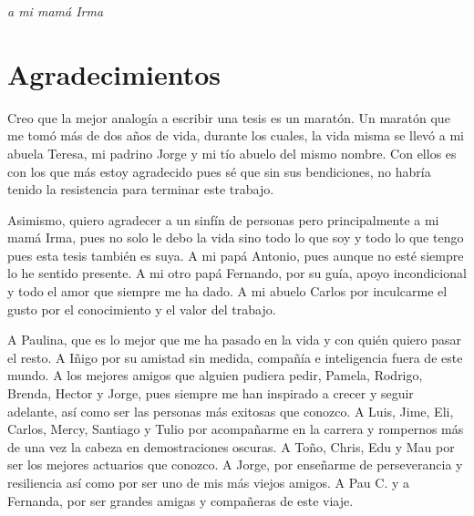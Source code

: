 \documentclass[../Main/Main.tex]{subfiles}
\begin{document}
\begin{flushright}
	\null{}
	\emph{a mi mamá Irma} 
	\null
\end{flushright}


\section*{Agradecimientos}
\thispagestyle{empty}

Creo que la mejor analogía a escribir una tesis es un maratón. Un maratón que me tomó más de dos años de vida, durante los cuales, la vida misma se llevó a mi abuela Teresa, mi padrino Jorge y mi tío abuelo del mismo nombre. Con ellos es con los que más estoy agradecido pues sé que sin sus bendiciones, no habría tenido la resistencia para terminar este trabajo.

Asimismo, quiero agradecer a un sinfín de personas pero principalmente a mi mamá Irma, pues no solo le debo la vida sino todo lo que soy y todo lo que tengo pues esta tesis también es suya. A mi papá Antonio, pues aunque no esté siempre lo he sentido presente. A mi otro papá Fernando, por su guía, apoyo incondicional y todo el amor que siempre me ha dado. A mi abuelo Carlos por inculcarme el gusto por el conocimiento y el valor del trabajo. 

A Paulina, que es lo mejor que me ha pasado en la vida y con quién quiero pasar el resto. A Iñigo por su amistad sin medida, compañía e inteligencia fuera de este mundo. A los mejores amigos que alguien pudiera pedir, Pamela, Rodrigo, Brenda, Hector y Jorge, pues siempre me han inspirado a crecer y seguir adelante, así como ser las personas más exitosas que conozco. A Luis, Jime, Eli, Carlos, Mercy, Santiago y Tulio por acompañarme en la carrera y rompernos más de una vez la cabeza en demostraciones oscuras. A Toño, Chris, Edu y Mau por ser los mejores actuarios que conozco. A Jorge, por enseñarme de perseverancia y resiliencia así como por ser uno de mis más viejos amigos. A Pau C. y a Fernanda, por ser grandes amigas y compañeras de este viaje.
\thispagestyle{empty}
\end{document}
